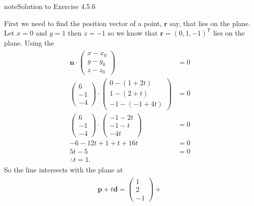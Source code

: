 \documentclass[letterpaper,10pt,english]{jupyterBook}
\begin{document}
\begin{sphinxadmonition}{note}{Solution to Exercise 4.5.6}



\sphinxAtStartPar
First we need to find the position vector of a point, \(\mathbf{r}\) say, that lies on the plane. Let \(x=0\) and \(y=1\) then \(z=-1\) so we know that \(\mathbf{r} = (0, 1, -1)^\mathsf{T}\) lies on the plane. Using the {\hyperref[\detokenize{_pages/4.2_Planes:point-normal-definition}]{}}
\begin{equation*}
\begin{split} \begin{align*}
    \mathbf{n} \cdot \begin{pmatrix} x - x_0 \\ y - y_0 \\ z - z_0 \end{pmatrix} &= 0 \\
    \begin{pmatrix} 6 \\ -1 \\ -4 \end{pmatrix} \cdot
    \begin{pmatrix} 0 - (1 + 2 t) \\ 1 - (2 + t) \\ -1 - (-1 + 4 t) \end{pmatrix} &= 0 \\
    \begin{pmatrix} 6 \\ -1 \\ -4 \end{pmatrix} \cdot
    \begin{pmatrix} - 1 - 2 t \\ -1 - t \\  -4 t \end{pmatrix} &= 0 \\
    -6 - 12 t + 1 + t + 16 t &= 0 \\
    5 t - 5 &= 0 \\
    \therefore t = 1.
\end{align*} \end{split}
\end{equation*}
\sphinxAtStartPar
So the line intersects with the plane at
\begin{equation*}
\begin{split} \begin{align*}
    \mathbf{p} + t \mathbf{d} = 
    \begin{pmatrix} 1 \\ 2 \\ -1 \end{pmatrix} + 

\end{align*}
\end{split}
\end{equation*}
\end{sphinxadmonition}
\end{document}
